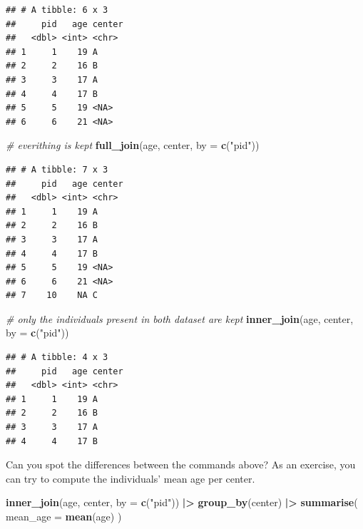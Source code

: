 \documentclass[
]{book}
\newenvironment{Shaded}{\begin{snugshade}}{\end{snugshade}}
\newcommand{\AttributeTok}[1]{\textcolor[rgb]{0.13,0.29,0.53}{#1}}
\newcommand{\CommentTok}[1]{\textcolor[rgb]{0.56,0.35,0.01}{\textit{#1}}}
\newcommand{\FunctionTok}[1]{\textcolor[rgb]{0.13,0.29,0.53}{\textbf{#1}}}
\newcommand{\NormalTok}[1]{#1}
\newcommand{\SpecialCharTok}[1]{\textcolor[rgb]{0.81,0.36,0.00}{\textbf{#1}}}
\newcommand{\StringTok}[1]{\textcolor[rgb]{0.31,0.60,0.02}{#1}}
\begin{document}
\begin{verbatim}
## # A tibble: 6 x 3
##     pid   age center
##   <dbl> <int> <chr> 
## 1     1    19 A     
## 2     2    16 B     
## 3     3    17 A     
## 4     4    17 B     
## 5     5    19 <NA>  
## 6     6    21 <NA>
\end{verbatim}

\begin{Shaded}
\begin{Highlighting}[]
\CommentTok{\# everithing is kept}
\FunctionTok{full\_join}\NormalTok{(age, center, }\AttributeTok{by =} \FunctionTok{c}\NormalTok{(}\StringTok{"pid"}\NormalTok{))}
\end{Highlighting}
\end{Shaded}

\begin{verbatim}
## # A tibble: 7 x 3
##     pid   age center
##   <dbl> <int> <chr> 
## 1     1    19 A     
## 2     2    16 B     
## 3     3    17 A     
## 4     4    17 B     
## 5     5    19 <NA>  
## 6     6    21 <NA>  
## 7    10    NA C
\end{verbatim}

\begin{Shaded}
\begin{Highlighting}[]
\CommentTok{\# only the individuals present in both dataset are kept}
\FunctionTok{inner\_join}\NormalTok{(age, center, }\AttributeTok{by =} \FunctionTok{c}\NormalTok{(}\StringTok{"pid"}\NormalTok{))}
\end{Highlighting}
\end{Shaded}

\begin{verbatim}
## # A tibble: 4 x 3
##     pid   age center
##   <dbl> <int> <chr> 
## 1     1    19 A     
## 2     2    16 B     
## 3     3    17 A     
## 4     4    17 B
\end{verbatim}

Can you spot the differences between the commands above?
As an exercise, you can try to compute the individuals' mean age per center.

\begin{Shaded}
\begin{Highlighting}[]
\FunctionTok{inner\_join}\NormalTok{(age, center, }\AttributeTok{by =} \FunctionTok{c}\NormalTok{(}\StringTok{"pid"}\NormalTok{)) }\SpecialCharTok{|\textgreater{}}
  \FunctionTok{group\_by}\NormalTok{(center) }\SpecialCharTok{|\textgreater{}}
  \FunctionTok{summarise}\NormalTok{(}
    \AttributeTok{mean\_age =} \FunctionTok{mean}\NormalTok{(age)}
\NormalTok{  )}
\end{Highlighting}
\end{Shaded}
\end{document}
